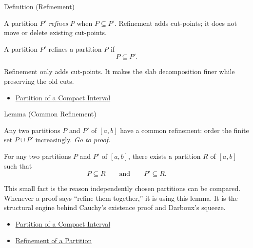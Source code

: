 \begin{definitionbox}{Definition (Refinement)}
\begin{definition}
\label{def:partition-refinement}
A partition \(P'\) \emph{refines} \(P\) when \(P\subseteq P'\). Refinement adds
cut-points; it does not move or delete existing cut-points.
\end{definition}
\end{definitionbox}

\begin{remark*}
A partition \(P'\) refines a partition \(P\) if
\[
  P\subseteq P'.
\]
\end{remark*}

\begin{remark*}[Interpretation]
Refinement only adds cut-points. It makes the slab decomposition finer while
preserving the old cuts.
\end{remark*}

\begin{dependencies}
\begin{itemize}
  \item \hyperref[def:integration-partition]{Partition of a Compact Interval}
\end{itemize}
\end{dependencies}

\begin{lemmabox}{Lemma (Common Refinement)}
\begin{lemma}
\label{lem:common-refinement-partitions}
Any two partitions \(P\) and \(P'\) of \([a,b]\) have a common refinement:
order the finite set \(P\cup P'\) increasingly.
\hyperref[prf:common-refinement-partitions]{\textit{Go to proof.}}
\end{lemma}
\end{lemmabox}

\begin{remark*}
For any two partitions \(P\) and \(P'\) of \([a,b]\), there exists a
partition \(R\) of \([a,b]\) such that
\[
  P\subseteq R
  \qquad\text{and}\qquad
  P'\subseteq R.
\]
\end{remark*}

\begin{remark*}[Interpretation]
This small fact is the reason independently chosen partitions can be compared.
Whenever a proof says ``refine them together,'' it is using this lemma. It is
the structural engine behind Cauchy's existence proof and Darboux's squeeze.
\end{remark*}

\begin{dependencies}
\begin{itemize}
  \item \hyperref[def:integration-partition]{Partition of a Compact Interval}
  \item \hyperref[def:partition-refinement]{Refinement of a Partition}
\end{itemize}
\end{dependencies}
